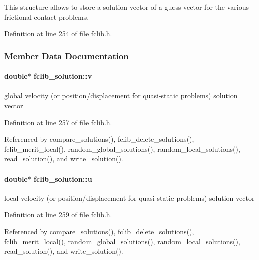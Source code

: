 This structure allows to store a solution vector of a guess vector for the various frictional contact problems. 

Definition at line 254 of file fclib.\-h.



\subsubsection{Member Data Documentation}
\hypertarget{structfclib__solution_a252982ce524686a094223a55c194fea8}{
\paragraph[{v}]{\setlength{\rightskip}{0pt plus 5cm}double$\ast$ fclib\-\_\-solution\-::v}}\label{structfclib__solution_a252982ce524686a094223a55c194fea8}


global velocity (or position/displacement for quasi-\/static problems) solution vector 



Definition at line 257 of file fclib.\-h.



Referenced by compare\-\_\-solutions(), fclib\-\_\-delete\-\_\-solutions(), fclib\-\_\-merit\-\_\-local(), random\-\_\-global\-\_\-solutions(), random\-\_\-local\-\_\-solutions(), read\-\_\-solution(), and write\-\_\-solution().

\hypertarget{structfclib__solution_acb160f0dad04b9420388464d256ae41f}{
\paragraph[{u}]{\setlength{\rightskip}{0pt plus 5cm}double$\ast$ fclib\-\_\-solution\-::u}}\label{structfclib__solution_acb160f0dad04b9420388464d256ae41f}


local velocity (or position/displacement for quasi-\/static problems) solution vector 



Definition at line 259 of file fclib.\-h.



Referenced by compare\-\_\-solutions(), fclib\-\_\-delete\-\_\-solutions(), fclib\-\_\-merit\-\_\-local(), random\-\_\-global\-\_\-solutions(), random\-\_\-local\-\_\-solutions(), read\-\_\-solution(), and write\-\_\-solution().

